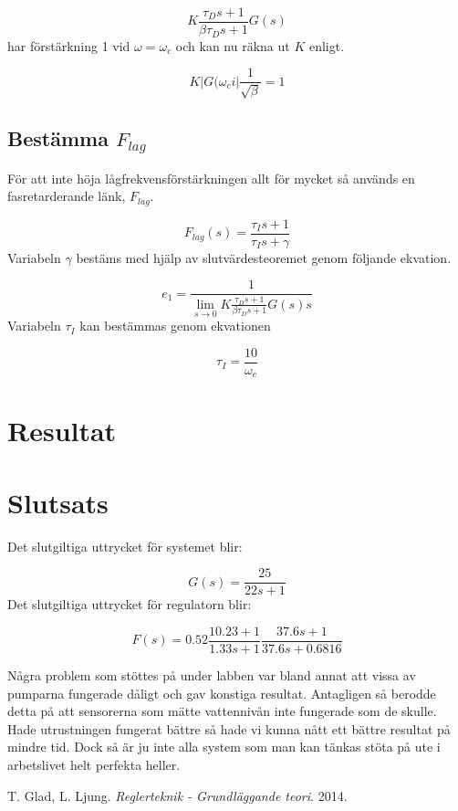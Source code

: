 \documentclass[a4paper]{article}
\begin{document}
\begin{equation}
  K\frac{\tau_Ds+1}{\beta\tau_Ds+1}G(s)
\end{equation}
har förstärkning 1 vid $\omega = \omega_c$ och kan nu räkna ut $K$ enligt.

\begin{equation}
  K|G(\omega_ci|\frac{1}{\sqrt{\beta}}=1
\end{equation}

\subsection{Bestämma $F_{lag}$}

För att inte höja lågfrekvensförstärkningen allt för mycket så används en fasretarderande länk, $F_{lag}$.

\begin{equation}
  F_{lag}(s)=\frac{\tau_Is+1}{\tau_Is+\gamma}
\end{equation}
Variabeln $\gamma$ bestäms med hjälp av slutvärdesteoremet genom följande ekvation.

\begin{equation}
  e_1=\frac{1}{\lim_{s \to 0}K\frac{\tau_Ds+1}{\beta\tau_Ds+1}G(s)s}
\end{equation}
Variabeln $\tau_I$ kan bestämmas genom ekvationen

\begin{equation}
  \tau_I=\frac{10}{\omega_c}
\end{equation}

\section{Resultat}



\section{Slutsats}

Det slutgiltiga uttrycket för systemet blir:

\begin{equation*}
  G(s)=\frac{25}{22s+1}
\end{equation*}
Det slutgiltiga uttrycket för regulatorn blir:

\begin{equation*}
  F(s)=0.52\frac{10.23+1}{1.33s+1} \frac{37.6s+1}{37.6s+0.6816}
\end{equation*}


Några problem som stöttes på under labben var bland annat att vissa av pumparna fungerade dåligt och gav konstiga resultat.
Antagligen så berodde detta på att sensorerna som mätte vattennivån inte fungerade som de skulle.
Hade utrustningen fungerat bättre så hade vi kunna nått ett bättre resultat på mindre tid.
Dock så är ju inte alla system som man kan tänkas stöta på ute i arbetslivet helt perfekta heller. 

\begin{thebibliography}{9}
    T. Glad, L. Ljung. 
    \emph{Reglerteknik - Grundläggande teori}.
    2014.
\end{thebibliography}
\end{document}
